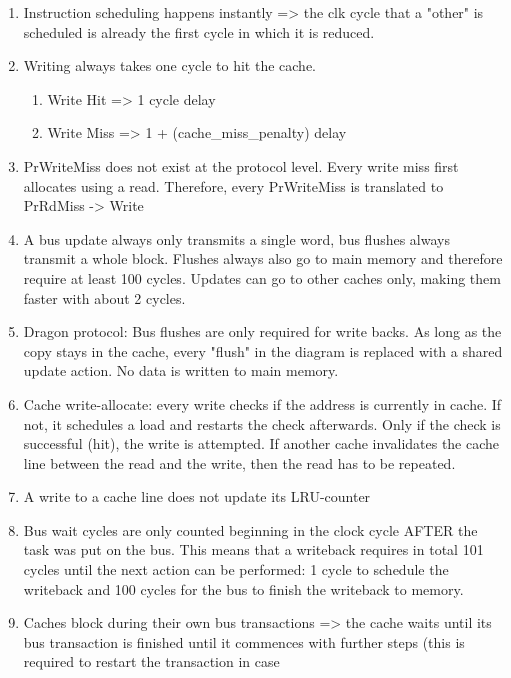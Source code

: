 \begin{enumerate}
    \item Instruction scheduling happens instantly => the clk cycle that a "other" is scheduled is
          already the first cycle in which it is reduced.
    \item Writing always takes one cycle to hit the cache.
          \begin{enumerate}
              \item Write Hit => 1 cycle delay
              \item Write Miss => 1 + (cache\_miss\_penalty) delay
          \end{enumerate}
    \item PrWriteMiss does not exist at the protocol level. Every write miss first allocates using a
          read. Therefore, every PrWriteMiss is translated to PrRdMiss -> Write
    \item A bus update always only transmits a single word, bus flushes always transmit a whole block.
          Flushes always also go to main memory and therefore require at least 100 cycles. Updates can go to
          other caches only, making them faster with about 2 cycles.
    \item Dragon protocol: Bus flushes are only required for write backs. As long as the copy stays in
          the cache, every "flush" in the diagram is replaced with a shared update action. No data is written
          to main memory.
    \item Cache write-allocate: every write checks if the address is currently in cache. If not, it
          schedules a load and restarts the check afterwards. Only if the check is successful (hit), the write
          is attempted. If another cache invalidates the cache line between the read and the write, then the
          read has to be repeated.
    \item A write to a cache line does not update its LRU-counter
    \item Bus wait cycles are only counted beginning in the clock cycle AFTER the task was put on the
          bus. This means that a writeback requires in total 101 cycles until the next action can be
          performed: 1 cycle to schedule the writeback and 100 cycles for the bus to finish the writeback to
          memory.
    \item Caches block during their own bus transactions => the cache waits until its bus transaction is
          finished until it commences with further steps (this is required to restart the transaction in case

\end{enumerate}
